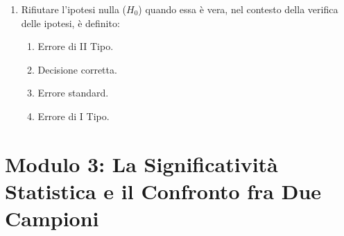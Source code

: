 \documentclass[12pt, a4paper]{article}
\begin{document}
\begin{enumerate}[resume]
    \item Rifiutare l'ipotesi nulla ($H_0$) quando essa è vera, nel contesto della verifica delle ipotesi, è definito:
    \begin{enumerate}
        \item Errore di II Tipo.
        \item Decisione corretta.
        \item Errore standard.
        \item Errore di I Tipo.
    \end{enumerate}
    \vspace{0.3cm}
\end{enumerate}

\section*{Modulo 3: La Significatività Statistica e il Confronto fra Due Campioni}
\end{document}

